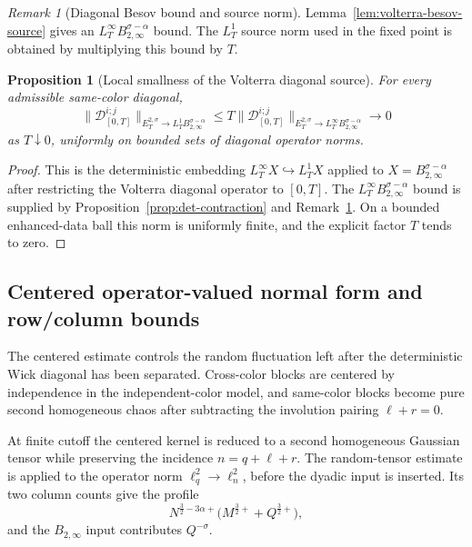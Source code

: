 \documentclass[10pt]{amsart}
\numberwithin{equation}{section}
\theoremstyle{plain}
\newtheorem{proposition}[theorem]{Proposition}
\theoremstyle{definition}
\theoremstyle{remark}
\newtheorem{remark}[theorem]{Remark}
\begin{document}
\begin{remark}[Diagonal Besov bound and source norm]\label{rem:diagonal-besov-source-conversion}
Lemma~\ref{lem:volterra-besov-source} gives an $L_T^\infty B_{2,\infty}^{\sigma-\alpha}$ bound.  The $L_T^1$ source norm used in the fixed point is obtained by multiplying this bound by $T$.
\end{remark}


\begin{proposition}[Local smallness of the Volterra diagonal source]\label{prop:det-diagonal-local-smallness}
For every admissible same-color diagonal,
\begin{equation}\label{eq:det-contraction-L1}
        \|\mathcal D^{i;j}_{[0,T]}\|_{E_T^{2,\sigma}\to L_T^1B_{2,\infty}^{\sigma-\alpha}}
        \le T\|\mathcal D^{i;j}_{[0,T]}\|_{E_T^{2,\sigma}\to L_T^\infty B_{2,\infty}^{\sigma-\alpha}}
        \to0
\end{equation}
as $T\downarrow0$, uniformly on bounded sets of diagonal operator norms.
\end{proposition}

\begin{proof}
This is the deterministic embedding $L_T^\infty X\hookrightarrow L_T^1X$ applied to $X=B_{2,\infty}^{\sigma-\alpha}$ after restricting the Volterra diagonal operator to $[0,T]$.  The $L_T^\infty B_{2,\infty}^{\sigma-\alpha}$ bound is supplied by Proposition~\ref{prop:det-contraction} and Remark~\ref{rem:diagonal-besov-source-conversion}.  On a bounded enhanced-data ball this norm is uniformly finite, and the explicit factor $T$ tends to zero.
\end{proof}

\subsection{Centered operator-valued normal form and row/column bounds}\label{subsec:centered-normal-form}

The centered estimate controls the random fluctuation left after the deterministic Wick diagonal has been separated.  Cross-color blocks are centered by independence in the independent-color model, and same-color blocks become pure second homogeneous chaos after subtracting the involution pairing \(\ell+r=0\).

At finite cutoff the centered kernel is reduced to a second homogeneous Gaussian tensor while preserving the incidence \(n=q+\ell+r\).  The random-tensor estimate is applied to the operator norm \(\ell_q^2\to\ell_n^2\), before the dyadic input is inserted.  Its two column counts give the profile
\[
        N^{\frac32-3\alpha+}\bigl(M^{\frac32+}+Q^{\frac32+}\bigr),
\]
and the \(B_{2,\infty}\) input contributes \(Q^{-\sigma}\).
\end{document}
